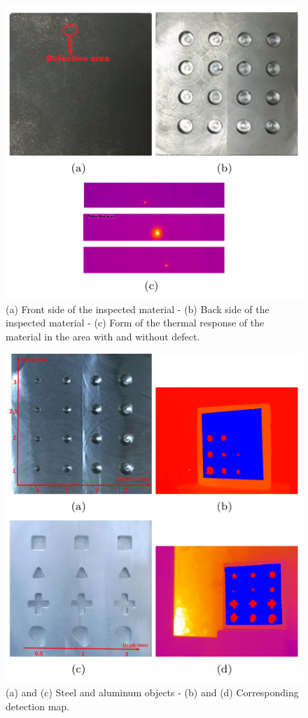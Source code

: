 \documentclass[12pt]{spieman}
\begin{document}
\begin{spacing}{2}
\newpage \begin{figure}\centering\includegraphics{Fig7}  
  \caption{(a) Front side of the inspected material - (b) Back side of the inspected
    material - (c) Form of the thermal response of the material in the area with and without
  defect.}
  \label{fig:44}
\end{figure}

\newpage \begin{figure}\centering\includegraphics{Fig8}  
  \caption{(a) and (c) Steel and aluminum objects - (b) and (d) Corresponding detection map.}
  \label{fig:6}
\end{figure}


\end{spacing}
\end{document}
